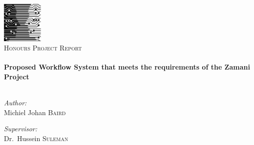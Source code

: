 \begin{titlepage}

\begin{center}


\includegraphics[width=0.15\textwidth]{./images/cslogo}\\[1cm]


\textsc{\Large Honours Project Report}\\[0.5cm]


\HRule \\[0.4cm]
{ \huge \bfseries Proposed Workflow System that meets the requirements of the Zamani Project}\\[0.4cm]

\HRule \\[1.5cm]

\begin{minipage}{0.4\textwidth}
\begin{flushleft} \large
\emph{Author:}\\
Michiel Johan \textsc{Baird}
\end{flushleft}
\end{minipage}
\begin{minipage}{0.4\textwidth}
\begin{flushright} \large
\emph{Supervisor:} \\
Dr.~Hussein \textsc{Suleman}
\end{flushright}
\end{minipage}


\end{center}
\end{titlepage}
